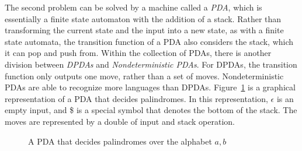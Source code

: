\documentclass[psamsfonts]{amsart}
\theoremstyle{definition}
\theoremstyle{remark}
\numberwithin{equation}{section}
\begin{document}
\par
The second problem can be solved by a machine called a \emph{\ac{PDA}}, which is essentially a finite state automaton with the addition of
a stack. Rather than transforming the current state and the input into a new
state, as with a finite state automata, the transition function of a \ac{PDA} also considers the stack, which it can pop and push from. Within the
collection of \acp{PDA}, there is another division between
\emph{\acp{DPDA}} and \emph{Nondeterministic \aclp{PDA}}. For \acp{DPDA}, the
transition function only outputs one move, rather than a set of
moves. Nondeterministic \acp{PDA} are able to recognize more languages than
\acp{DPDA}. Figure~\ref{fig:pda} is a graphical representation of a \ac{PDA}
that decides palindromes. In this representation, $\epsilon$ is an empty input,
and \$ is a special symbol that denotes the bottom of the stack. The moves are
represented by a double of input and stack operation.

\begin{figure}[h]
  \label{fig:pda}
  \caption{A \acl{PDA} that decides palindromes over the alphabet ${a,b}$}
\end{figure}
\end{document}
